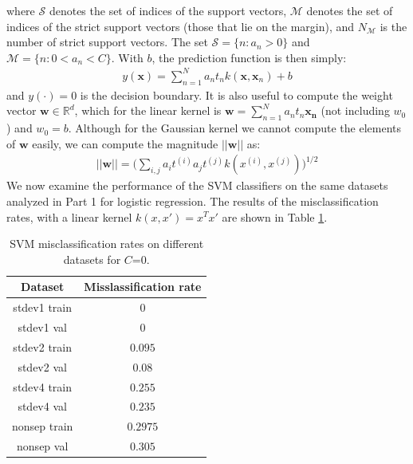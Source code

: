 \documentclass[10pt]{article}
\begin{document}
where $\mathcal{S}$ denotes the set of indices of the support vectors, $\mathcal{M}$ denotes the set of indices of the strict support vectors (those that lie on the margin), and $N_{\mathcal{M}}$ is the number of strict support vectors.  The set $\mathcal{S} = \{n : a_n > 0\}$ and $\mathcal{M} =\{n : 0 < a_n < C\}$. With $b$, the prediction function is then simply: 
\begin{equation}
\begin{aligned}
y(\mathbf{x}) = \sum_{n=1}^N a_nt_nk(\mathbf{x},\mathbf{x}_n) + b
\end{aligned}
\end{equation}
and $y(\cdot)=0$ is the decision boundary.  It is also useful to compute the weight vector $\mathbf{w} \in \mathbb{R}^d$, which for the linear kernel is $\mathbf{w} = \sum_{n=1}^{N} a_n t_n \mathbf{x_n} $ (not including $w_0$) and $w_0 = b$.  Although for the Gaussian kernel we cannot compute the elements of $\mathbf{w}$ easily, we can compute the magnitude $||\mathbf{w}||$ as:
\begin{equation}
\begin{aligned}
||\mathbf{w}||=\big(\sum_{i,j}a_it^{(i)}a_jt^{(j)} k(x^{(i)}, x^{(j)}) \big)^{1/2}
\end{aligned}
\end{equation}
We now examine the performance of the SVM classifiers on the same datasets analyzed in Part 1 for logistic regression.  The results of the misclassification rates, with a linear kernel $k(x,x') = x^Tx'$ are shown in Table \ref{C_0}.  

\begin{table}[H]
\begin{tabular}{|c|c|}
\hline
\textbf{Dataset} & \textbf{Misslassification rate} \\ \hline
stdev1 train & $0$\\ \hline
stdev1 val & $0$\\ \hline
stdev2 train & $0.095$\\ \hline
stdev2 val & $0.08$\\ \hline
stdev4 train & $0.255$\\ \hline
stdev4 val & $0.235$\\ \hline
nonsep train & $0.2975$\\ \hline
nonsep val & $0.305$\\ \hline
\end{tabular}
\caption{SVM misclassification rates on different datasets for $C$=0.}
\label{C_0}
\end{table}
\end{document}
